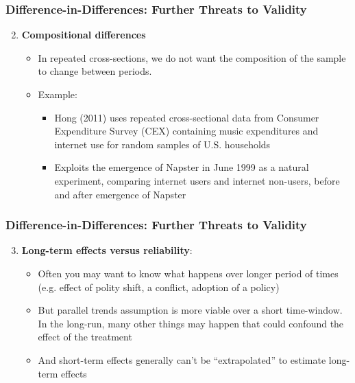 \documentclass[xcolor=dvipsnames]{beamer}
\begin{document}


\begin{frame}
  \frametitle{Difference-in-Differences: Further Threats to Validity}

\begin{enumerate}\setcounter{enumi}{1}

\item \textbf{Compositional differences}\bigskip
\begin{itemize}
  \item<1-> In repeated cross-sections, we do not want the composition of the sample to change between periods.\medskip
\item<2->  Example:
\begin{itemize}
  \item Hong (2011) uses repeated cross-sectional data from Consumer Expenditure Survey (CEX) containing music expenditures and internet use for random samples of U.S. households\medskip
   \item Exploits the emergence of Napster in June 1999 as a natural experiment, comparing internet users and internet non-users, before and after emergence of Napster
\end{itemize}
\end{itemize}
\end{enumerate}
\end{frame}
%

\begin{frame}
  \frametitle{Difference-in-Differences:  Further Threats to Validity}

\begin{enumerate}
\setcounter{enumi}{2}
\item \textbf{Long-term effects versus reliability}:
\begin{itemize}\medskip
\item Often you may want to know what happens over longer period of times (e.g. effect of polity shift, a conflict, adoption of a policy)
\medskip
  \item But parallel trends assumption is more viable over a short time-window. In the long-run, many other things may happen that could confound the effect of the treatment\medskip
\item And short-term effects generally can't be ``extrapolated'' to estimate long-term effects
\end{itemize}
\end{enumerate}
\end{frame}
\end{document}
